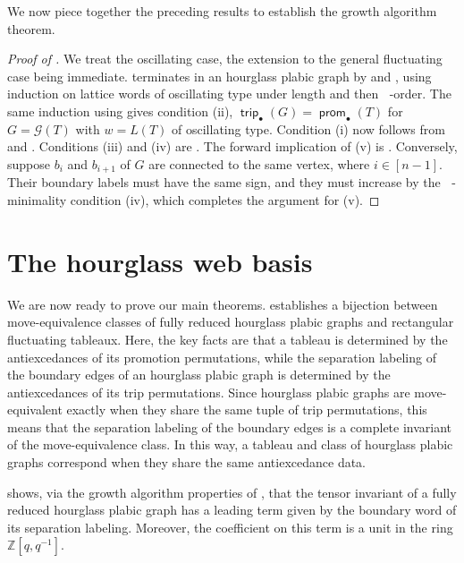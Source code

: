 \documentclass{amsart}
\theoremstyle{definition}
\theoremstyle{remark}
\numberwithin{equation}{section}
\DeclareMathOperator{\trip}{\mathsf{trip}}
\DeclareMathOperator{\prom}{\mathsf{prom}}
\DeclareMathOperator{\tlex}{l\widetilde{ex}}
\begin{document}
We now piece together the preceding results to establish the growth algorithm theorem.

\begin{proof}[Proof of {}]
  We treat the oscillating case, the extension to the general fluctuating case being immediate.  terminates in an hourglass plabic graph by  and , using induction on lattice words of oscillating type under length and then $\tlex$-order. The same induction using  gives condition (ii), $\trip_\bullet(G) = \prom_\bullet(T)$ for $G = \mathcal{G}(T)$ with $w = L(T)$ of oscillating type. Condition (i) now follows from  and . Conditions (iii) and (iv) are . The forward implication of (v) is . Conversely, suppose $b_i$ and $b_{i+1}$ of $G$ are connected to the same vertex, where $i \in [n-1]$. Their boundary labels must have the same sign, and they must increase by the $\tlex$-minimality condition (iv), which completes the argument for (v). 
\end{proof}

\section{The hourglass web basis}
\label{sec:bijection-and-basis}

We are now ready to prove our main theorems.  establishes a bijection between move-equivalence classes of fully reduced hourglass plabic graphs and rectangular fluctuating tableaux. Here, the key facts are that a tableau is determined by the antiexcedances of its promotion permutations, while the separation labeling of the boundary edges of an hourglass plabic graph is determined by the antiexcedances of its trip permutations. Since hourglass plabic graphs are move-equivalent exactly when they share the same tuple of trip permutations, this means that the separation labeling of the boundary edges is a complete invariant of the move-equivalence class. In this way, a tableau and class of hourglass plabic graphs correspond when they share the same antiexcedance data.

 shows, via the growth algorithm properties of , that the tensor invariant of a fully reduced hourglass plabic graph has a leading term given by the boundary word of its separation labeling. Moreover, the coefficient on this term is a unit in the ring $\mathbb{Z}[q, q^{-1}]$.
\end{document}
